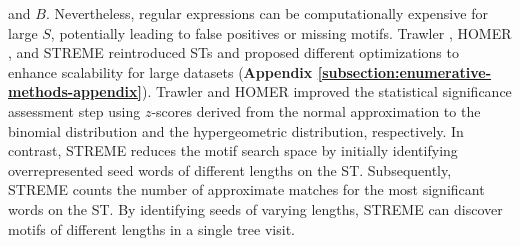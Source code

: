 \documentclass[a4paper, titlepage, openright]{book}
\begin{document}
and $B$. Nevertheless, regular expressions can be computationally expensive for large $S$, potentially leading to false positives or missing motifs. Trawler \citep{ettwiller2007trawler}, HOMER \citep{heinz2010simple}, and STREME \citep{bailey2021streme} reintroduced STs and proposed different optimizations to enhance scalability for large datasets (\textbf{Appendix \ref{subsection:enumerative-methods-appendix}}). Trawler and HOMER improved the statistical significance assessment step using $z$-scores derived from the normal approximation to the binomial distribution and the hypergeometric distribution, respectively. In contrast, STREME reduces the motif search space by initially identifying overrepresented seed words of different lengths on the ST. Subsequently, STREME counts the number of approximate matches for the most significant words on the ST. By identifying seeds of varying lengths, STREME can discover motifs of different lengths in a single tree visit.

\end{document}
